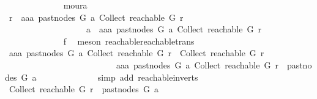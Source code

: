 \begin{isabellebody}
\ \ \ \ \ \ \ \ \ \ \ \ \isamarkupfalse%
\ moura\isanewline
\ \ \ \ \ \ \ \ \ \ \isamarkupfalse%
\ {\isachardoublequoteopen}r\ {\isasymrightarrow}\isactrlsup {\isacharasterisk}{\kern0pt}\ aaa\ {\isacharparenleft}{\kern0pt}past{\isacharunderscore}{\kern0pt}nodes\ G\ a{\isacharparenright}{\kern0pt}\ {\isacharparenleft}{\kern0pt}Collect\ {\isacharparenleft}{\kern0pt}reachable\ G\ r{\isacharparenright}{\kern0pt}{\isacharparenright}{\kern0pt}\isanewline
\ \ \ \ \ \ \ \ \ \ \ \ \ \ \ \ \ \ {\isasymlongrightarrow}\ a\ {\isasymrightarrow}\isactrlsup {\isacharplus}{\kern0pt}\ aaa\ {\isacharparenleft}{\kern0pt}past{\isacharunderscore}{\kern0pt}nodes\ G\ a{\isacharparenright}{\kern0pt}\ {\isacharparenleft}{\kern0pt}Collect\ {\isacharparenleft}{\kern0pt}reachable\ G\ r{\isacharparenright}{\kern0pt}{\isacharparenright}{\kern0pt}{\isachardoublequoteclose}\isanewline
\ \ \ \ \ \ \ \ \ \ \ \ \isamarkupfalse%
\ f{}\ \isamarkupfalse%
\ {\isacharparenleft}{\kern0pt}meson\ reachable{}{\isacharunderscore}{\kern0pt}reachable{\isacharunderscore}{\kern0pt}trans{\isacharparenright}{\kern0pt}\isanewline
\ \ \ \ \ \ \ \ \ \ \isamarkupfalse%
\ \isamarkupfalse%
\ {\isachardoublequoteopen}aaa\ {\isacharparenleft}{\kern0pt}past{\isacharunderscore}{\kern0pt}nodes\ G\ a{\isacharparenright}{\kern0pt}\ {\isacharparenleft}{\kern0pt}Collect\ {\isacharparenleft}{\kern0pt}reachable\ G\ r{\isacharparenright}{\kern0pt}{\isacharparenright}{\kern0pt}\ {\isasymnotin}\ Collect\ {\isacharparenleft}{\kern0pt}reachable\ G\ r{\isacharparenright}{\kern0pt}\isanewline
\ \ \ \ \ \ \ \ \ \ \ \ \ \ \ \ \ \ \ \ \ \ \ \ \ {\isasymor}\ aaa\ {\isacharparenleft}{\kern0pt}past{\isacharunderscore}{\kern0pt}nodes\ G\ a{\isacharparenright}{\kern0pt}\ {\isacharparenleft}{\kern0pt}Collect\ {\isacharparenleft}{\kern0pt}reachable\ G\ r{\isacharparenright}{\kern0pt}{\isacharparenright}{\kern0pt}\ {\isasymin}\ past{\isacharunderscore}{\kern0pt}nodes\ G\ a{\isachardoublequoteclose}\isanewline
\ \ \ \ \ \ \ \ \ \ \ \ \isamarkupfalse%
\ {\isacharparenleft}{\kern0pt}simp\ add{\isacharcolon}{\kern0pt}\ reachable{\isacharunderscore}{\kern0pt}in{\isacharunderscore}{\kern0pt}verts{\isacharparenleft}{\kern0pt}{}{\isacharparenright}{\kern0pt}{\isacharparenright}{\kern0pt}\isanewline
\ \ \ \ \ \ \ \ \ \ \isamarkupfalse%
\ \isamarkupfalse%
\ {\isachardoublequoteopen}Collect\ {\isacharparenleft}{\kern0pt}reachable\ G\ r{\isacharparenright}{\kern0pt}\ {\isasymsubseteq}\ past{\isacharunderscore}{\kern0pt}nodes\ G\ a{\isachardoublequoteclose}\isanewline

\end{isabellebody}
